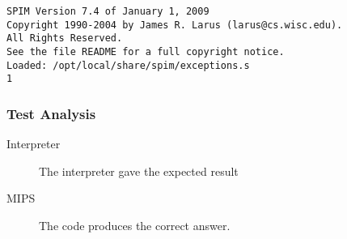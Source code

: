 \begin{verbatim}
SPIM Version 7.4 of January 1, 2009
Copyright 1990-2004 by James R. Larus (larus@cs.wisc.edu).
All Rights Reserved.
See the file README for a full copyright notice.
Loaded: /opt/local/share/spim/exceptions.s
1
\end{verbatim}
\subsubsection{Test Analysis}
\begin{description}
	\item[Interpreter] The interpreter gave the expected result
	\item[MIPS] The code produces the correct answer.
\end{description}